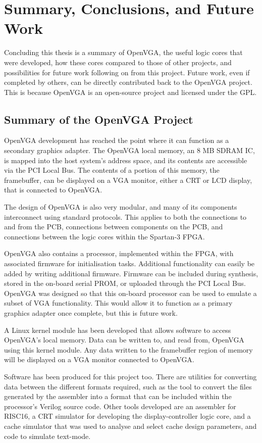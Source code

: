 \chapter{Summary, Conclusions, and Future Work}
\label{CONCLUSION}

Concluding this thesis is a summary of OpenVGA, the useful logic cores that were
developed, how these cores compared to those of other projects, and possibilities
for future work following on from this project. Future work, even if completed by
others, can be directly contributed back to the OpenVGA project. This is because
OpenVGA is an open-source project and licensed under the GPL.


\section{Summary of the OpenVGA Project}

OpenVGA development has reached the point where it can function as a secondary
graphics adapter. The OpenVGA local memory, an 8 MB SDRAM IC, is mapped into the
host system's address space, and its contents are accessible via the PCI Local
Bus. The contents of a portion of this memory, the framebuffer, can be displayed
on a VGA monitor, either a CRT or LCD display, that is connected to OpenVGA.

The design of OpenVGA is also very modular, and many of its components
interconnect using standard protocols. This applies to both the connections to
and from the PCB, connections between components on the PCB, and connections
between the logic cores within the Spartan-3 FPGA.

OpenVGA also contains a processor, implemented within the FPGA, with associated
firmware for initialisation tasks. Additional functionality can easily be added
by writing additional firmware. Firmware can be included during synthesis, stored
in the on-board serial PROM, or uploaded through the PCI Local Bus. OpenVGA was
designed so that this on-board processor can be used to emulate a subset of VGA
functionality. This would allow it to function as a primary graphics adapter once
complete, but this is future work.

A Linux kernel module has been developed that allows software to access OpenVGA's
local memory. Data can be written to, and read from, OpenVGA using this kernel
module. Any data written to the framebuffer region of memory will be displayed on
a VGA monitor connected to OpenVGA.

Software has been produced for this project too. There are utilities for
converting data between the different formats required, such as the tool to
convert the files generated by the assembler into a format that can be included
within the processor's Verilog source code. Other tools developed are an
assembler for RISC16, a CRT simulator for developing the display-controller logic
core, and a cache simulator that was used to analyse and select cache design
parameters, and code to simulate text-mode.

